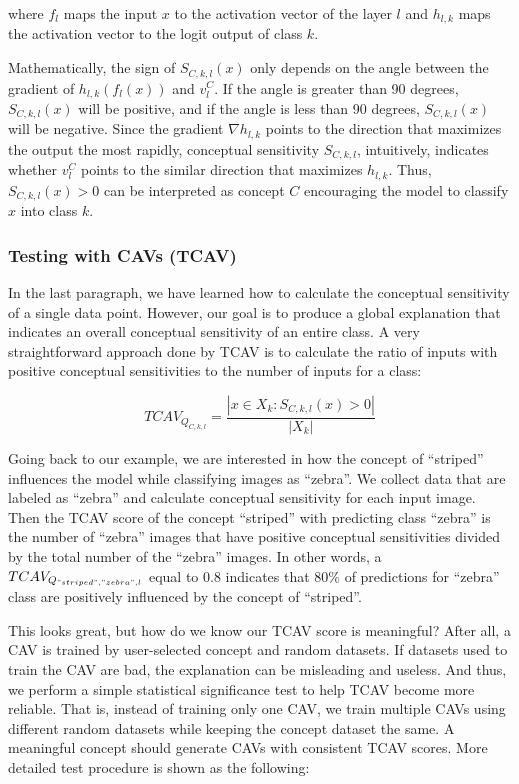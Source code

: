 \documentclass[
  12pt,
]{krantz}
\begin{document}
where \(f_l\) maps the input \(x\) to the activation vector of the layer \(l\) and \(h_{l,k}\) maps the activation vector to the logit output of class \(k\).

Mathematically, the sign of \(S_{C,k,l}(x)\) only depends on the angle between the gradient of \(h_{l,k}(f_l(x))\) and \(v_l^C\).
If the angle is greater than 90 degrees, \(S_{C,k,l}(x)\) will be positive, and if the angle is less than 90 degrees, \(S_{C,k,l}(x)\) will be negative.
Since the gradient \(\nabla h_{l,k}\) points to the direction that maximizes the output the most rapidly, conceptual sensitivity \(S_{C,k,l}\), intuitively, indicates whether \(v_l^C\) points to the similar direction that maximizes \(h_{l,k}\).
Thus, \(S_{C,k,l}(x)>0\) can be interpreted as concept \(C\) encouraging the model to classify \(x\) into class \(k\).

\hypertarget{testing-with-cavs-tcav}{%
\subsubsection{Testing with CAVs (TCAV)}\label{testing-with-cavs-tcav}}

In the last paragraph, we have learned how to calculate the conceptual sensitivity of a single data point.
However, our goal is to produce a global explanation that indicates an overall conceptual sensitivity of an entire class.
A very straightforward approach done by TCAV is to calculate the ratio of inputs with positive conceptual sensitivities to the number of inputs for a class:

\[TCAV_{Q_{C,k,l}}=\frac{|{x\in X_k:S_{C,k,l}(x)>0}|}{|X_k|}\]

Going back to our example, we are interested in how the concept of ``striped'' influences the model while classifying images as ``zebra''.
We collect data that are labeled as ``zebra'' and calculate conceptual sensitivity for each input image.
Then the TCAV score of the concept ``striped'' with predicting class ``zebra'' is the number of ``zebra'' images that have positive conceptual sensitivities divided by the total number of the ``zebra'' images.
In other words, a \(TCAV_{Q_{"striped","zebra",l}}\) equal to 0.8 indicates that 80\% of predictions for ``zebra'' class are positively influenced by the concept of ``striped''.

This looks great, but how do we know our TCAV score is meaningful?
After all, a CAV is trained by user-selected concept and random datasets.
If datasets used to train the CAV are bad, the explanation can be misleading and useless.
And thus, we perform a simple statistical significance test to help TCAV become more reliable.
That is, instead of training only one CAV, we train multiple CAVs using different random datasets while keeping the concept dataset the same.
A meaningful concept should generate CAVs with consistent TCAV scores.
More detailed test procedure is shown as the following:
\end{document}
